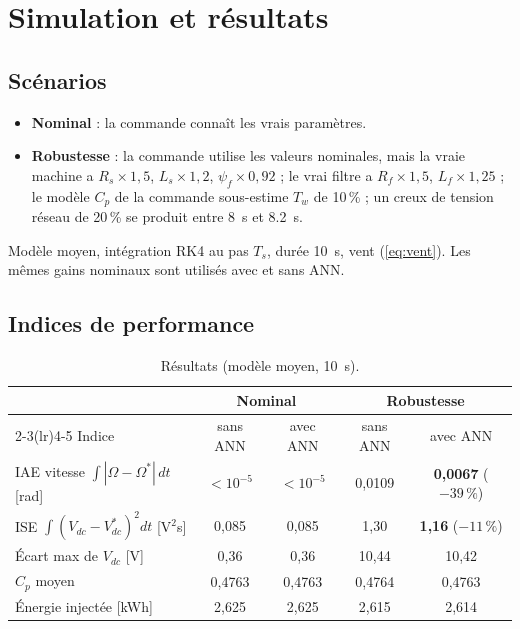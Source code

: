\documentclass[11pt,a4paper]{article}
\theoremstyle{remark}
\begin{document}
\section{Simulation et résultats}

\subsection{Scénarios}
\begin{itemize}
  \item \textbf{Nominal} : la commande connaît les vrais paramètres.
  \item \textbf{Robustesse} : la commande utilise les valeurs nominales, mais
        la vraie machine a $R_s\times1{,}5$, $L_s\times1{,}2$, $\psi_f\times0{,}92$ ;
        le vrai filtre a $R_f\times1{,}5$, $L_f\times1{,}25$ ;
        le modèle $C_p$ de la commande sous-estime $T_w$ de 10\,\% ;
        un creux de tension réseau de 20\,\% se produit entre \SI{8}{s} et \SI{8,2}{s}.
\end{itemize}
Modèle moyen, intégration RK4 au pas $T_s$, durée \SI{10}{s}, vent (\ref{eq:vent}). Les mêmes gains
nominaux sont utilisés avec et sans ANN.

\subsection{Indices de performance}
\begin{table}[h]
\centering
\caption{Résultats (modèle moyen, \SI{10}{s}).}
\label{tab:res}
\begin{tabular}{lcccc}
\toprule
& \multicolumn{2}{c}{Nominal} & \multicolumn{2}{c}{Robustesse}\\
\cmidrule(lr){2-3}\cmidrule(lr){4-5}
Indice & sans ANN & avec ANN & sans ANN & avec ANN\\
\midrule
IAE vitesse $\int|\Omega-\Omega^*|\,dt$ [rad] & $<10^{-5}$ & $<10^{-5}$ & 0,0109 & \textbf{0,0067} ($-39\,\%$)\\
ISE $\int(V_{dc}-V_{dc}^*)^2dt$ [V$^2$s] & 0,085 & 0,085 & 1,30 & \textbf{1,16} ($-11\,\%$)\\
Écart max de $V_{dc}$ [V] & 0,36 & 0,36 & 10,44 & 10,42\\
$C_p$ moyen & 0,4763 & 0,4763 & 0,4764 & 0,4763\\
Énergie injectée [kWh] & 2,625 & 2,625 & 2,615 & 2,614\\
\bottomrule
\end{tabular}
\end{table}
\end{document}
